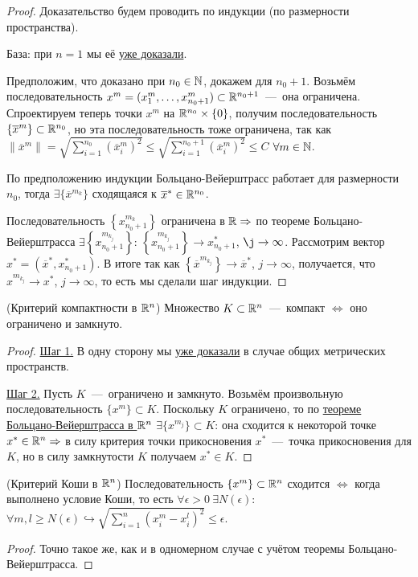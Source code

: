 \begin{proof}
    Доказательство будем проводить по индукции (по размерности пространства).
    
    База: при $n = 1$ мы её \hyperlink{thm2.8}{уже доказали}.

    Предположим, что доказано при $n_{0} \in \mathbb{N}$, докажем для $n_{0} + 1$. Возьмём последовательность $x^{m} = (x^{m}_{1}, \ldots, x^{m}_{n_{0} + 1}) \subset \mathbb{R}^{n_{0} + 1}$~---~она ограничена. Спроектируем теперь точки $x^{m}$ на $\mathbb{R}^{n_{0}} \times \{0\}$, получим последовательность $\{\overline{x}^{m}\} \subset \mathbb{R}^{n_{0}}$, но эта последовательность тоже ограничена, так как $\displaystyle \| \overline{x}^{m}\| = \sqrt{\sum_{i = 1}^{n_{0}} \left(\overline{x}^{m}_{i}\right)^{2}} \leq \sqrt{\sum_{i = 1}^{n_{0} + 1} \left(\overline{x}^{m}_{i}\right)^{2}} \leq C$ $\forall m \in \mathbb{N}$.

    По предположению индукции Больцано-Вейерштрасс работает для размерности $n_{0}$, тогда $\exists \{\overline{x}^{m_{k}}\}$ сходящаяся к $\overline{x}^{*} \in \mathbb{R}^{n_{0}}$.

    Последовательность $\left\{ x^{m_{k}}_{n_{0} + 1}\right\}$ ограничена в $\mathbb{R} \Rightarrow$ по теореме Больцано-Вейерштрасса $\exists \left\{x^{m_{k_{j}}}_{n_{0} + 1}\right\}$: $\left\{x^{m_{k_{j}}}_{n_{0} + 1}\right\}\to x^{*}_{n_{0} + 1}$, $\j\to \infty$. Рассмотрим вектор $x^{*} = (\overline{x}^{*}, x^{*}_{n_{0} + 1})$. В итоге так как $\left\{ \overline{x}^{m_{k_j}}\right\}\to \overline{x}^{*}$, $j\to \infty$, получается, что $x^{m_{k_j}}\to x^{*}$, $j\to \infty$, то есть мы сделали шаг индукции.
\end{proof}
\begin{theorem}
    (Критерий компактности в $\mathbb{R}^n$) Множество $K \subset \mathbb{R}^n$~---~компакт $\Leftrightarrow$ оно ограничено и замкнуто.
\end{theorem}
\begin{proof}
    \underline{Шаг 1.} В одну сторону мы \hyperlink{lemm7.6}{уже доказали} в случае общих метрических пространств.

    \underline{Шаг 2.} Пусть $K$~---~ограничено и замкнуто. Возьмём произвольную последовательность $\{ x^{m} \} \subset K$. Поскольку $K$ ограничено, то по \hyperlink{thm7.10}{теореме Больцано-Вейерштрасса в $\mathbb{R}^{n}$} $\exists \{x^{m_{j}}\} \subset K$: она сходится к некоторой точке $x^{*} \in \mathbb{R}^n \Rightarrow$ в силу критерия точки прикосновения $x^{*}$~---~точка прикосновения для $K$, но в силу замкнутости $K$ получаем $x^{*} \in K$.
\end{proof}
\begin{theorem}
    (Критерий Коши в $\mathbb{R}^n$) Последовательность $\{ x^{m}\} \subset \mathbb{R}^{n}$ сходится $\Leftrightarrow$ когда выполнено условие Коши, то есть $\displaystyle \forall \epsilon > 0 \ \exists N (\epsilon)$: $\displaystyle \forall m, l \geq N (\epsilon) \hookrightarrow \sqrt{\sum_{i = 1}^{n} (x^{m}_{i} - x^{l}_{i})^{2}} \leq \epsilon$.
\end{theorem}
\begin{proof}
    Точно такое же, как и в одномерном случае с учётом теоремы Больцано-Вейерштрасса.
\end{proof}

